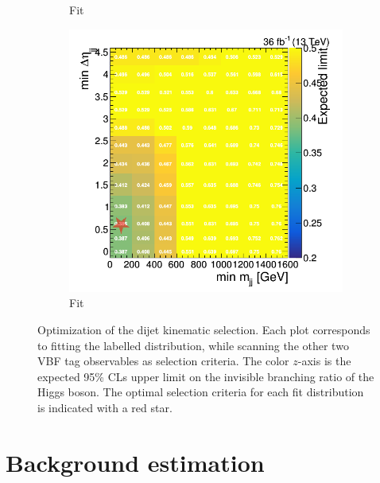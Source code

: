 \begin{figure}[]
\begin{center}
\begin{subfigure}[t]{0.32\textwidth}
            \caption{Fit \deta}
        \end{subfigure}
        \begin{subfigure}[t]{0.32\textwidth}
            \includegraphics[width=\textwidth]{figures/vbf/opt/optimized_scan_deta_mjj.png}
            \caption{Fit \dphi}
        \end{subfigure}
        \caption{Optimization of the dijet kinematic selection.
                 Each plot corresponds to fitting the labelled distribution, while scanning the other two VBF tag observables as selection criteria.
                 The color $z$-axis is the expected 95\% CLs upper limit on the invisible branching ratio of the Higgs boson.
                 The optimal selection criteria for each fit distribution is indicated with a red star.}
        \label{fig:vbf:opt}
    \end{center}
\end{figure}

\section{Background estimation}
\label{sec:vbf:bkg}

